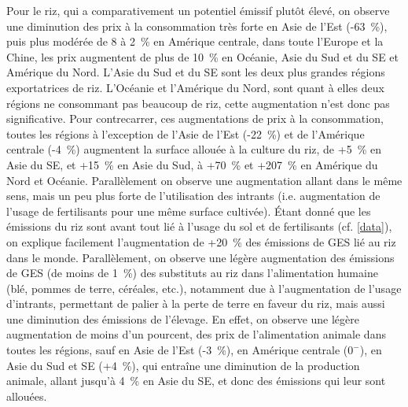 Pour le riz, qui a comparativement un potentiel émissif plutôt élevé, on observe une diminution des prix à la consommation très forte en Asie de l'Est (-63~\%), puis plus modérée de 8 à 2~\% en Amérique centrale, dans toute l'Europe et la Chine, les prix augmentent de plus de 10~\% en Océanie, Asie du Sud et du SE et Amérique du Nord. L'Asie du Sud et du SE sont les deux plus grandes régions exportatrices de riz. L'Océanie et l'Amérique du Nord, sont quant à elles deux régions ne consommant pas beaucoup de riz, cette augmentation n'est donc pas significative. Pour contrecarrer, ces augmentations de prix à la consommation, toutes les régions à l'exception de l'Asie de l'Est (-22~\%) et de l'Amérique centrale (-4~\%) augmentent la surface allouée à la culture du riz, de +5~\% en Asie du SE, et +15~\% en Asie du Sud, à +70~\% et +207~\% en Amérique du Nord et Océanie. Parallèlement on observe une augmentation allant dans le même sens, mais un peu plus forte de l'utilisation des intrants (i.e. augmentation de l'usage de fertilisants pour une même surface cultivée). Étant donné que les émissions du riz sont avant tout lié à l'usage du sol et de fertilisants (cf. \ref{data}), on explique facilement l'augmentation de +20~\% des émissions de GES lié au riz dans le monde. Parallèlement, on observe une légère augmentation des émissions de GES (de moins de 1~\%) des substituts au riz dans l'alimentation humaine (blé, pommes de terre, céréales, etc.), notamment due à l'augmentation de l'usage d'intrants, permettant de palier à la perte de terre en faveur du riz, mais aussi une diminution des émissions de l'élevage. En effet, on observe une légère augmentation de moins d'un pourcent, des prix de l'alimentation animale dans toutes les régions, sauf en Asie de l'Est (-3~\%), en Amérique centrale ($0^-$), en Asie du Sud et SE (+4~\%), qui entraîne une diminution de la production animale, allant jusqu'à 4~\% en Asie du SE, et donc des émissions qui leur sont allouées.

